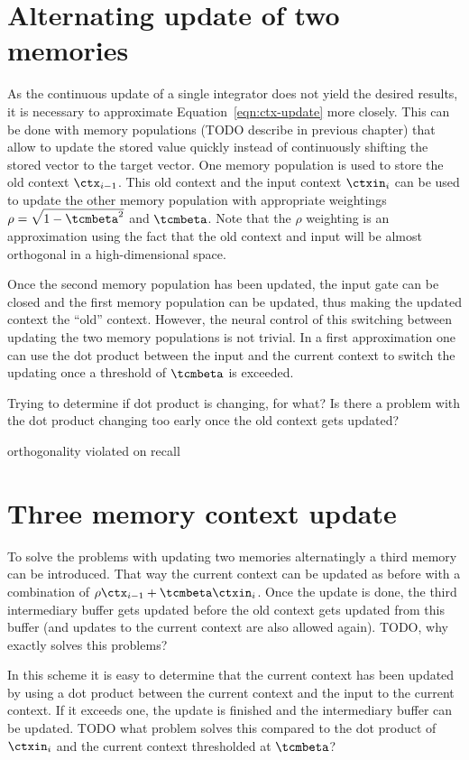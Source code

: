 \section{Alternating update of two memories}
As the continuous update of a single integrator does not yield the desired results, it is necessary to approximate Equation~\ref{eqn:ctx-update} more closely.
This can be done with memory populations (TODO describe in previous chapter) that allow to update the stored value quickly instead of continuously shifting the stored vector to the target vector.
One memory population is used to store the old context $\ctx_{i-1}$.
This old context and the input context $\ctxin_i$ can be used to update the other memory population with appropriate weightings $\rho = \sqrt{1 - \tcmbeta^2}$ and $\tcmbeta$.
Note that the $\rho$ weighting is an approximation using the fact that the old context and input will be almost orthogonal in a high-dimensional space.

Once the second memory population has been updated, the input gate can be closed and the first memory population can be updated, thus making the updated context the ``old'' context.
However, the neural control of this switching between updating the two memory populations is not trivial.
In a first approximation one can use the dot product between the input and the current context to switch the updating once a threshold of $\tcmbeta$ is exceeded.

Trying to determine if dot product is changing, for what?
Is there a problem with the dot product changing too early once the old context gets updated?

orthogonality violated on recall

\section{Three memory context update}
To solve the problems with updating two memories alternatingly a third memory can be introduced.
That way the current context can be updated as before with a combination of $\rho \ctx_{i-1} + \tcmbeta \ctxin_i$.
Once the update is done, the third intermediary buffer gets updated before the old context gets updated from this buffer (and updates to the current context are also allowed again). TODO, why exactly solves this problems?

In this scheme it is easy to determine that the current context has been updated by using a dot product between the current context and the input to the current context.
If it exceeds one, the update is finished and the intermediary buffer can be updated.
TODO what problem solves this compared to the dot product of $\ctxin_i$ and the current context thresholded at $\tcmbeta$?

